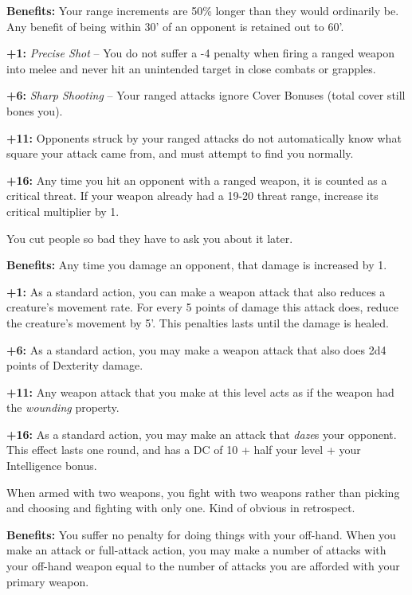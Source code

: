 \textbf{Benefits:} Your range increments are 50\% longer than they would ordinarily be. Any benefit of being within 30' of an opponent is retained out to 60'.

\textbf{+1:} \textit{Precise Shot} -- You do not suffer a -4 penalty when firing a ranged weapon into melee and never hit an unintended target in close combats or grapples.

\textbf{+6:} \textit{Sharp Shooting} -- Your ranged attacks ignore Cover Bonuses (total cover still bones you).

\textbf{+11:} Opponents struck by your ranged attacks do not automatically know what square your attack came from, and must attempt to find you normally.

\textbf{+16:} Any time you hit an opponent with a ranged weapon, it is counted as a critical threat. If your weapon already had a 19-20 threat range, increase its critical multiplier by 1.


You cut people so bad they have to ask you about it later.

\textbf{Benefits:} Any time you damage an opponent, that damage is increased by 1.

\textbf{+1:} As a standard action, you can make a weapon attack that also reduces a creature's movement rate. For every 5 points of damage this attack does, reduce the creature's movement by 5'. This penalties lasts until the damage is healed.

\textbf{+6:} As a standard action, you may make a weapon attack that also does 2d4 points of Dexterity damage.

\textbf{+11:} Any weapon attack that you make at this level acts as if the weapon had the \textit{wounding} property.

\textbf{+16:} As a standard action, you may make an attack that \textit{daze}s your opponent. This effect lasts one round, and has a DC of 10 + half your level + your Intelligence bonus.


When armed with two weapons, you fight with two weapons rather than picking and choosing and fighting with only one. Kind of obvious in retrospect.

\textbf{Benefits:} You suffer no penalty for doing things with your off-hand. When you make an attack or full-attack action, you may make a number of attacks with your off-hand weapon equal to the number of attacks you are afforded with your primary weapon.

